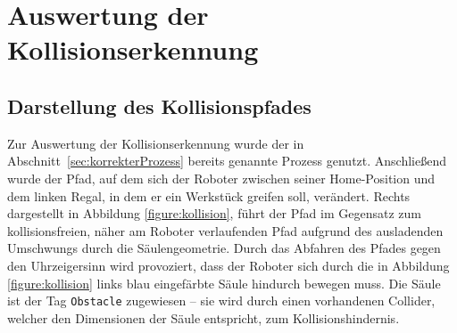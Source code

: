 \section{Auswertung der Kollisionserkennung}
\label{sec:collisionauswertung}

\subsection{Darstellung des Kollisionspfades}
Zur Auswertung der Kollisionserkennung
wurde der in Abschnitt~\ref{sec:korrekterProzess} bereits genannte
Prozess genutzt. Anschließend wurde
der Pfad, auf dem sich der Roboter zwischen seiner Home-Position und dem linken
Regal, in dem er ein Werkstück greifen soll, verändert. Rechts dargestellt in
Abbildung \ref{figure:kollision}, führt der Pfad im Gegensatz zum
kollisionsfreien, näher am Roboter verlaufenden Pfad aufgrund des ausladenden
Umschwungs durch die Säulengeometrie. Durch das Abfahren des Pfades gegen den
Uhrzeigersinn wird provoziert, dass der Roboter sich durch die in Abbildung
\ref{figure:kollision} links blau eingefärbte Säule hindurch bewegen
muss. Die Säule ist der Tag \texttt{Obstacle} zugewiesen – sie wird
durch einen vorhandenen Collider,
welcher den Dimensionen der Säule entspricht, zum Kollisionshindernis.

